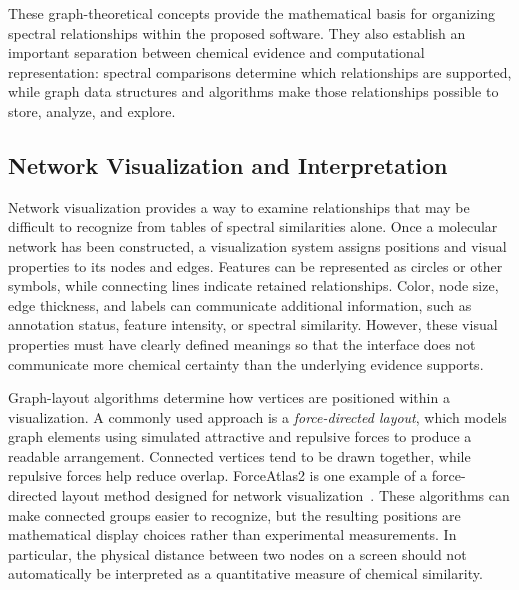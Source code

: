         These graph-theoretical concepts provide the mathematical basis for organizing spectral relationships within the proposed software. They also establish an important separation between chemical evidence and computational representation: spectral comparisons determine which relationships are supported, while graph data structures and algorithms make those relationships possible to store, analyze, and explore.

    \subsection{Network Visualization and Interpretation}\label{subsec:network-visualization}


        Network visualization provides a way to examine relationships that may be difficult to recognize from tables of spectral similarities alone. Once a molecular network has been constructed, a visualization system assigns positions and visual properties to its nodes and edges. Features can be represented as circles or other symbols, while connecting lines indicate retained relationships. Color, node size, edge thickness, and labels can communicate additional information, such as annotation status, feature intensity, or spectral similarity. However, these visual properties must have clearly defined meanings so that the interface does not communicate more chemical certainty than the underlying evidence supports.

        Graph-layout algorithms determine how vertices are positioned within a visualization. A commonly used approach is a \emph{force-directed layout}, which models graph elements using simulated attractive and repulsive forces to produce a readable arrangement. Connected vertices tend to be drawn together, while repulsive forces help reduce overlap. ForceAtlas2 is one example of a force-directed layout method designed for network visualization~\cite{Jacomy2014}. These algorithms can make connected groups easier to recognize, but the resulting positions are mathematical display choices rather than experimental measurements. In particular, the physical distance between two nodes on a screen should not automatically be interpreted as a quantitative measure of chemical similarity.

